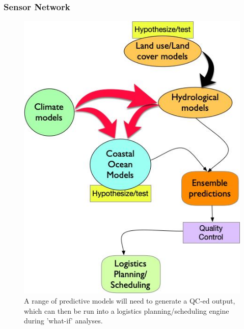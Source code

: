 
\subsubsection*{Sensor Network}


\begin{figure}
  \centering
  \includegraphics[scale=0.30]{fig/process.jpg}
  \caption{A range of predictive models will need to generate a QC-ed
    output, which can then be run into a logistics planning/scheduling
    engine during 'what-if' analyses.}
  \label{fig:process}
\end{figure}

